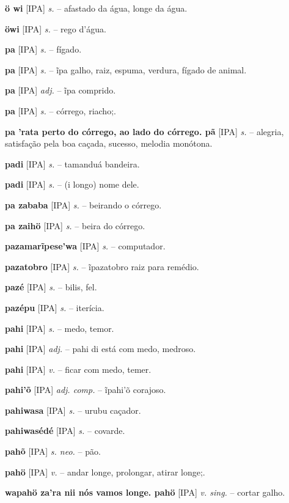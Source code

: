 \textbf{ö wi} [IPA] \textit{s.} -- afastado da água, longe da água.

\textbf{öwi} [IPA] \textit{s.} -- rego d'água.   %

\textbf{pa} [IPA] \textit{s.} -- fígado.

\textbf{pa} [IPA] \textit{s.} -- ĩpa galho, raiz, espuma, verdura, fígado de animal.

\textbf{pa} [IPA] \textit{adj.} -- ĩpa comprido.

\textbf{pa} [IPA] \textit{s.} -- córrego, riacho;.

\textbf{pa 'rata perto do córrego, ao lado do córrego. pã} [IPA] \textit{s.} -- alegria, satisfação pela boa caçada, sucesso, melodia monótona.

\textbf{padi} [IPA] \textit{s.} -- tamanduá bandeira.

\textbf{padi} [IPA] \textit{s.} -- (i longo) nome dele.

\textbf{pa zababa} [IPA] \textit{s.} -- beirando o córrego.

\textbf{pa zaihö} [IPA] \textit{s.} -- beira do córrego.

\textbf{pazamarĩpese'wa} [IPA] \textit{s.} -- computador.

\textbf{pazatobro} [IPA] \textit{s.} -- ĩpazatobro raiz para remédio.

\textbf{pazé} [IPA] \textit{s.} -- bilis, fel.

\textbf{pazépu} [IPA] \textit{s.} -- iterícia.

\textbf{pahi} [IPA] \textit{s.} -- medo, temor.

\textbf{pahi} [IPA] \textit{adj.} -- pahi di está com medo, medroso.

\textbf{pahi} [IPA] \textit{v.} -- ficar com medo, temer.

\textbf{pahi'õ} [IPA] \textit{adj. comp.} -- ĩpahi'õ corajoso.

\textbf{pahiwasa} [IPA] \textit{s.} -- urubu caçador.

\textbf{pahiwasédé} [IPA] \textit{s.} -- covarde.

\textbf{pahõ} [IPA] \textit{s. neo.} -- pão.

\textbf{pahö} [IPA] \textit{v.} -- andar longe, prolongar, atirar longe;.

\textbf{wapahö za'ra nii nós vamos longe. pahö} [IPA] \textit{v. sing.} -- cortar galho.

